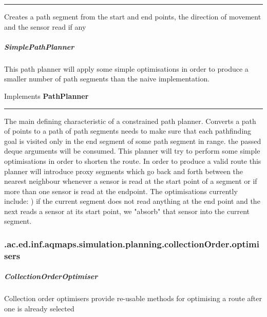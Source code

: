\hrule
\begin{mitem}
\scriptsize
	{Creates a path segment from the start and end points, the direction of movement and the sensor read if any}
	{}
\end{mitem}

\subparagraph{ SimplePathPlanner } This path planner will apply some simple optimisations in order to produce a smaller number of path segments than the naive implementation.
 
Implements \textbf{ PathPlanner }
\hrule
\begin{mitem}
\scriptsize
	{}
	{The main defining characteristic of a constrained path planner. Converts a path of points to a path of path segments\newline%
 needs to make sure that each pathfinding goal is visited only in the end segment of some path segment in range.\newline%
 the passed deque arguments will be consumed. This planner will try to perform some simple optimisations in order to shorten the route.\newline%
 In order to produce a valid route this planner will introduce proxy segments which go back and forth between the nearest neighbour\newline%
 whenever a sensor is read at the start point of a segment or if more than one sensor is read at the endpoint. The optimisations currently include:\newline%
  ) if the current segment does not read anything at the end point and the next reads a sensor at its start point, we "absorb" that sensor into\newline%
 the current segment.}
\end{mitem}

\subsubsection{ .ac.ed.inf.aqmaps.simulation.planning.collectionOrder.optimisers }
\subparagraph{ CollectionOrderOptimiser } Collection order optimisers provide re-usable methods for optimising a route after one is already selected
 
